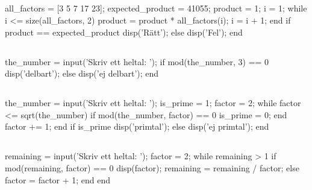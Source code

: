 \subsection*{}
\vspace{3pt}
\begin{matlab}
all_factors = [3 5 7 17 23]; %
expected_product = 41055; %
product = 1;
i = 1;
while i <= size(all_factors, 2)
	product = product * all_factors(i);
	i = i + 1;
end
if product == expected_product
	disp('Rätt');
else
	disp('Fel');
end
\end{matlab}

\subsection*{}
\vspace{3pt}
\begin{matlab}
the_number = input('Skriv ett heltal: ');
if mod(the_number, 3) == 0
	disp('delbart');
else
	disp('ej delbart');
end
\end{matlab}

\subsection*{}
\vspace{3pt}
\begin{matlab}
the_number = input('Skriv ett heltal: ');
is_prime = 1;
factor = 2;
while factor <= sqrt(the_number)
	if mod(the_number, factor) == 0
		is_prime = 0;
	end
	factor += 1;
end
if is_prime
	disp('primtal');
else
	disp('ej primtal');
end
\end{matlab}

\subsection*{}
\vspace{3pt}
\begin{matlab}
remaining = input('Skriv ett heltal: ');
factor = 2;
while remaining > 1
	if mod(remaining, factor) == 0
		disp(factor);
		remaining = remaining / factor;
	else
		factor = factor + 1;
	end
end
\end{matlab}

